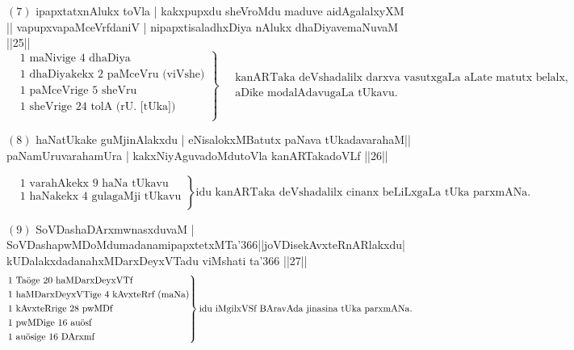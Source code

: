 $(7)$ ipapxtatxnAlukx toVla | kakxpupxdu sheVroMdu maduve aidAgalalxyXM || vapupxvapaMceVrfdaniV | nipapxtisaladhxDiya nAlukx dhaDiyavemaNuvaM ||25||
\begin{equation*}
\left.
\begin{aligned}
&\text {$1$ maNivige $4$ dhaDiya}\\
&\text {$1$ dhaDiyakekx $2$ paMceVru (viVshe)}\\
&\text {$1$ paMceVrige $5$ sheVru}\\
&\text {$1$ sheVrige $24$ tolA (rU. [tUka])}\\
\end{aligned}
\right\}
\quad
\begin{matrix}
\text{kanARTaka deVshadalilx darxva vasutxgaLa
aLate matutx belalx,}\\
\text{aDike modalAdavugaLa tUkavu.}
\end{matrix}
\end{equation*}

\eject

$(8)$ haNatUkake guMjinAlakxdu | eNisalokxMBatutx paNava tUkadavarahaM|| paNamUruvarahamUra | kakxNiyAguvadoMdutoVla kanARTakadoVLf ||26|| 

\quad{}
\begin{equation*}
\left.
\begin{aligned}
&\text{$1$ varahAkekx $9$ haNa tUkavu}\\
&\text{$1$ haNakekx $4$ gulagaMji tUkavu}\\
\end{aligned}
\right\}
\text {idu kanARTaka deVshadalilx cinanx beLiLxgaLa tUka parxmANa.}
\end{equation*}

$(9)$ SoVDashaDArxmwnasxduvaM | SoVDashapwMDoMdumadanamipapxtetxMTa\char'366||joVDisekAvxteRnARlakxdu| kUDalakxdadanahxMDarxDeyxVTadu viMshati ta\char'366 ||27||
\begin{equation*}
\left.
\begin{aligned}
&\text{$1$ Ta\char'366ge $20$ haMDarxDeyxVTf}\\
&\text{$1$ haMDarxDeyxVTige $4$ kAvxteRrf (maNa)}\\
&\text{$1$ kAvxteRrige $28$ pwMDf}\\
&\text{$1$ pwMDige $16$ au\char'366sf}\\
&\text{$1$ au\char'366sige $16$ DArxmf}\\
\end{aligned}
\right\}
\text {idu iMgilxVSf BAravAda jinasina tUka parxmANa.}
\end{equation*}

